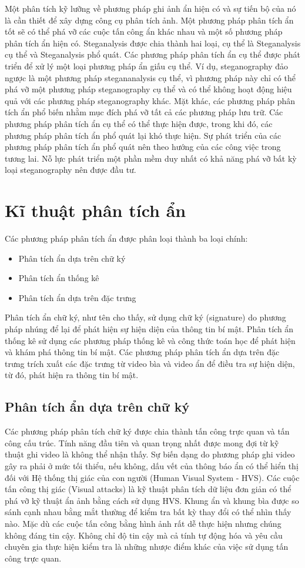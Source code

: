  Một phân tích kỹ lưỡng về phương pháp ghi ảnh ẩn hiện có và sự tiến bộ của nó là cần thiết để xây dựng công cụ phân tích ảnh. Một phương pháp phân tích ẩn tốt sẽ có thể phá vỡ các cuộc tấn công ẩn khác nhau và một số phương pháp phân tích ẩn hiện có. Steganalysis được chia thành hai loại, cụ thể là Steganalysis cụ thể và Steganalysis phổ quát. Các phương pháp phân tích ẩn cụ thể được phát triển để xử lý một loại phương pháp ẩn giấu cụ thể. Ví dụ, steganography đảo ngược là một phương pháp stegananalysis cụ thể, vì phương pháp này chỉ có thể phá vỡ một phương pháp steganography cụ thể và có thể không hoạt động hiệu quả với các phương pháp steganography khác. Mặt khác, các phương pháp phân tích ẩn phổ biến nhằm mục đích phá vỡ tất cả các phương pháp lưu trữ. Các phương pháp phân tích ẩn cụ thể có thể thực hiện được, trong khi đó, các phương pháp phân tích ẩn phổ quát lại khó thực hiện. Sự phát triển của các phương pháp phân tích ẩn phổ quát nên theo hướng của các công việc trong tương lai. Nỗ lực phát triển một phần mềm duy nhất có khả năng phá vỡ bất kỳ loại steganography nên được đầu tư.

 \section{Kĩ thuật phân tích ẩn}
 Các phương pháp phân tích ẩn được phân loại thành ba loại chính:
 \begin{itemize}
     \item Phân tích ẩn dựa trên chữ ký
     \item Phân tích ẩn thống kê
     \item Phân tích ẩn dựa trên đặc trưng
 \end{itemize}
 
 Phân tích ẩn chữ ký, như tên cho thấy, sử dụng chữ ký (signature) do phương pháp nhúng để lại để phát hiện sự hiện diện của thông tin bí mật. Phân tích ẩn thống kê sử dụng các phương pháp thống kê và công thức toán học để phát hiện và khám phá thông tin bí mật. Các phương pháp phân tích ẩn dựa trên đặc trưng trích xuất các đặc trưng từ video bìa và video ẩn để điều tra sự hiện diện, từ đó, phát hiện ra thông tin bí mật.

 \subsection{Phân tích ẩn dựa trên chữ ký}
 Các phương pháp phân tích chữ ký được chia thành tấn công trực quan và tấn công cấu trúc. Tính năng đầu tiên và quan trọng nhất được mong đợi từ kỹ thuật ghi video là không thể nhận thấy. Sự biến dạng do phương pháp ghi video gây ra phải ở mức tối thiểu, nếu không, dấu vết của thông báo ẩn có thể hiển thị đối với Hệ thống thị giác của con người (Human Visual System - HVS). Các cuộc tấn công thị giác (Visual
attacks) là kỹ thuật phân tích dữ liệu đơn giản có thể phá vỡ kỹ thuật ẩn ảnh bằng cách sử dụng HVS. Khung ẩn và khung bìa được so sánh cạnh nhau bằng mắt thường để kiểm tra bất kỳ thay đổi có thể nhìn thấy nào. Mặc dù các cuộc tấn công bằng hình ảnh rất dễ thực hiện nhưng chúng không đáng tin cậy. Không chỉ độ tin cậy mà cả tính tự động hóa và yêu cầu chuyên gia thực hiện kiểm tra là những nhược điểm khác của việc sử dụng tấn công trực quan.

